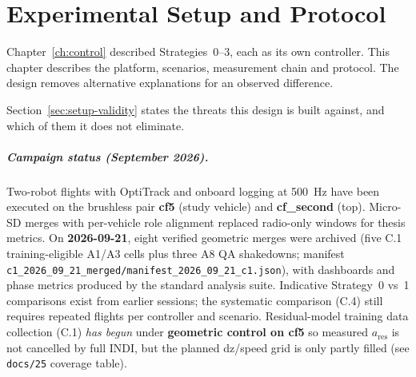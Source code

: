 %
%
%

\chapter{Experimental Setup and Protocol}
\label{ch:setup}

Chapter~\ref{ch:control} described Strategies~0--3, each as its own controller. This chapter
describes the platform, scenarios, measurement chain and protocol. The design removes alternative
explanations for an observed difference.

Section~\ref{sec:setup-validity} states the threats this design is built against, and which of
them it does not eliminate.

\paragraph{Campaign status (September 2026).}
Two-robot flights with OptiTrack and onboard logging at \SI{500}{\hertz} have been executed on
the brushless pair \textbf{cf5} (study vehicle) and \textbf{cf\_second} (top). Micro-SD merges
with per-vehicle role alignment replaced radio-only windows for thesis metrics. On
\textbf{2026-09-21}, eight verified geometric merges were archived (five C.1 training-eligible
A1/A3 cells plus three A8 QA shakedowns; manifest
\texttt{c1\_2026\_09\_21\_merged/manifest\_2026\_09\_21\_c1.json}), with dashboards and phase
metrics produced by the standard analysis suite. Indicative Strategy~0 vs~1 comparisons exist from
earlier sessions; the systematic comparison (C.4) still requires repeated flights per controller
and scenario. Residual-model training data collection (C.1) \emph{has begun} under
\textbf{geometric control on cf5} so measured $a_{\mathrm{res}}$ is not cancelled by full INDI,
but the planned dz/speed grid is only partly filled (see \texttt{docs/25} coverage table).

